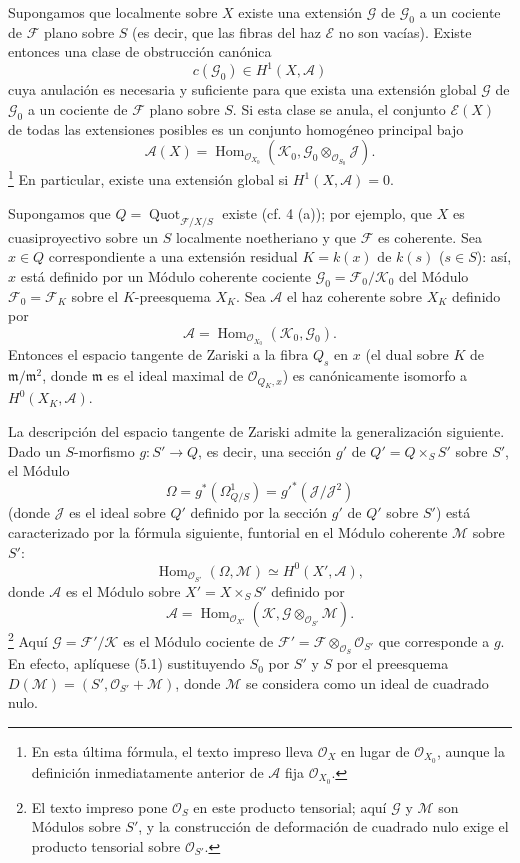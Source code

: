  Supongamos que localmente sobre $X$ existe una
extensión $\mathcal G$ de $\mathcal G_0$ a un cociente de $\mathcal F$ plano
sobre $S$ (es decir, que las fibras del haz $\mathcal E$ no son vacías).
Existe entonces una clase de obstrucción canónica
\[
c(\mathcal G_0)\in H^1(X,\mathcal A)
\]
cuya anulación es necesaria y suficiente para que exista una extensión global
$\mathcal G$ de $\mathcal G_0$ a un cociente de $\mathcal F$ plano sobre $S$.
Si esta clase se anula, el conjunto $\mathcal E(X)$ de todas las extensiones
posibles es un conjunto homogéneo principal bajo
\[
\mathcal A(X)=\operatorname{Hom}_{\mathcal O_{X_0}}
(\mathcal K_0,\mathcal G_0\otimes_{\mathcal O_{S_0}}\mathcal J).
\]
\footnote{En esta última fórmula, el texto impreso lleva $\mathcal O_X$ en
lugar de $\mathcal O_{X_0}$, aunque la definición inmediatamente anterior de
$\mathcal A$ fija $\mathcal O_{X_0}$.}
En particular, existe una extensión global si $H^1(X,\mathcal A)=0$.

 Supongamos que
$Q=\operatorname{Quot}_{\mathcal F/X/S}$ existe (cf. 4 (a)); por ejemplo, que
$X$ es cuasiproyectivo sobre un $S$ localmente noetheriano y que $\mathcal F$
es coherente. Sea $x\in Q$ correspondiente a una extensión residual
$K=k(x)$ de $k(s)$ ($s\in S$):
así, $x$ está definido por un Módulo coherente cociente
$\mathcal G_0=\mathcal F_0/\mathcal K_0$ del Módulo
$\mathcal F_0=\mathcal F_K$ sobre el $K$-preesquema $X_K$. Sea $\mathcal A$
el haz coherente sobre $X_K$ definido por
\[
\mathcal A=\operatorname{Hom}_{\mathcal O_{X_0}}(\mathcal K_0,\mathcal G_0).
\]
Entonces el espacio tangente de Zariski a la fibra $Q_s$ en $x$ (el dual
sobre $K$ de $\mathfrak m/\mathfrak m^2$, donde $\mathfrak m$ es el ideal
maximal de $\mathcal O_{Q_K,x}$) es canónicamente isomorfo a
$H^0(X_K,\mathcal A)$.

La descripción del espacio tangente de Zariski admite la generalización
siguiente. Dado un $S$-morfismo $g:S'\longrightarrow Q$, es decir, una sección
$g'$ de $Q'=Q\times_SS'$ sobre $S'$, el Módulo
\[
\Omega=g^*(\Omega^1_{Q/S})=g'^*(\mathcal J/\mathcal J^2)
\]
(donde $\mathcal J$ es el ideal sobre $Q'$ definido por la sección $g'$ de
$Q'$ sobre $S'$) está caracterizado por la fórmula siguiente, funtorial en el
Módulo coherente $\mathcal M$ sobre $S'$:
\[
\operatorname{Hom}_{\mathcal O_{S'}}(\Omega,\mathcal M)
\simeq H^0(X',\mathcal A),
\]
donde $\mathcal A$ es el Módulo sobre $X'=X\times_SS'$ definido por
\[
\mathcal A=\operatorname{Hom}_{\mathcal O_{X'}}
(\mathcal K,\mathcal G\otimes_{\mathcal O_{S'}}\mathcal M).
\]
\footnote{El texto impreso pone $\mathcal O_S$ en este producto tensorial;
aquí $\mathcal G$ y $\mathcal M$ son Módulos sobre $S'$, y la construcción de
deformación de cuadrado nulo exige el producto tensorial sobre
$\mathcal O_{S'}$.}
Aquí $\mathcal G=\mathcal F'/\mathcal K$ es el Módulo cociente de
$\mathcal F'=\mathcal F\otimes_{\mathcal O_S}\mathcal O_{S'}$ que corresponde
a $g$. En efecto, aplíquese (5.1) sustituyendo $S_0$ por $S'$ y $S$ por el
preesquema $D(\mathcal M)=(S',\mathcal O_{S'}+\mathcal M)$, donde
$\mathcal M$ se considera como un ideal de cuadrado nulo.

